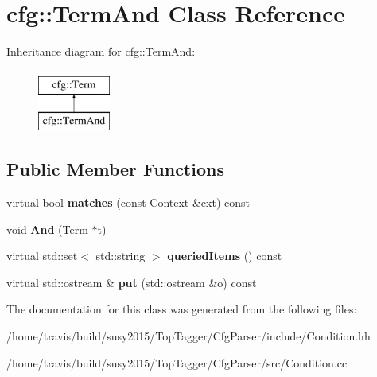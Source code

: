 \hypertarget{classcfg_1_1TermAnd}{\section{cfg\-:\-:Term\-And Class Reference}
\label{classcfg_1_1TermAnd}
}
Inheritance diagram for cfg\-:\-:Term\-And\-:\begin{figure}[H]
\begin{center}
\leavevmode
\includegraphics[height=2.000000cm]{classcfg_1_1TermAnd}
\end{center}
\end{figure}
\subsection*{Public Member Functions}
\begin{DoxyCompactItemize}
\item 
\hypertarget{classcfg_1_1TermAnd_af5918a76635aeca7bc01e5108f3206a1}{virtual bool {\bfseries matches} (const \hyperlink{classcfg_1_1Context}{Context} \&cxt) const }\label{classcfg_1_1TermAnd_af5918a76635aeca7bc01e5108f3206a1}

\item 
\hypertarget{classcfg_1_1TermAnd_a84dc305009d030accaef9600b9aaabb4}{void {\bfseries And} (\hyperlink{classcfg_1_1Term}{Term} $\ast$t)}\label{classcfg_1_1TermAnd_a84dc305009d030accaef9600b9aaabb4}

\item 
\hypertarget{classcfg_1_1TermAnd_a81179a1b7c8a4376702c4f8db261976c}{virtual std\-::set$<$ std\-::string $>$ {\bfseries queried\-Items} () const }\label{classcfg_1_1TermAnd_a81179a1b7c8a4376702c4f8db261976c}

\item 
\hypertarget{classcfg_1_1TermAnd_a612399f722085d523e5bdeac915182ca}{virtual std\-::ostream \& {\bfseries put} (std\-::ostream \&o) const }\label{classcfg_1_1TermAnd_a612399f722085d523e5bdeac915182ca}

\end{DoxyCompactItemize}


The documentation for this class was generated from the following files\-:\begin{DoxyCompactItemize}
\item 
/home/travis/build/susy2015/\-Top\-Tagger/\-Cfg\-Parser/include/Condition.\-hh\item 
/home/travis/build/susy2015/\-Top\-Tagger/\-Cfg\-Parser/src/Condition.\-cc\end{DoxyCompactItemize}
